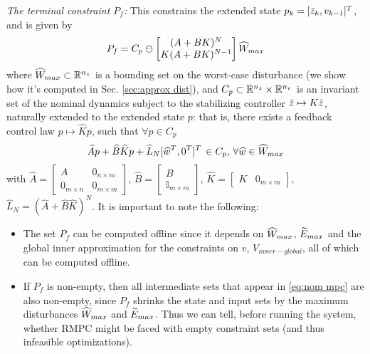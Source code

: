\textit{The terminal constraint $P_f$:}
This constrains the extended state $p_k = [\bar{z}_{k}, v_{k-1}]^T$, and is given by 
\begin{equation}
\label{eq:P_f_def}
P_f = C_p\ominus \left\lbrack \begin{matrix} (A+BK)^N \\ K(A+BK)^{N-1}\end{matrix} \right \rbrack \widehat{W}_{max}
\end{equation}
where $\widehat{W}_{max} \subset \mathbb{R}^{n_z}$ is a bounding set on the worst-case disturbance (we show how it's computed in Sec. \ref{sec:approx dist}),
and $C_p \subset \mathbb{R}^{n_z}\times \mathbb{R}^{n_v}$ is an invariant set of the nominal dynamics subject to the stabilizing controller $\bar{z} \mapsto K\bar{z}$, naturally extended to the extended state $p$:
that is, there exists a feedback control law $p \mapsto \widehat{K}p$, such that $\forall p\in C_p$
\begin{eqnarray}
\label{eq:C_def}
\widehat{A} p + \widehat{B} \widehat{K} p + \widehat{L}_N  [\widehat{w}^T, 0^T]^T \, \in C_p,\, \forall \widehat{w} \in \widehat{W}_{max} 
\end{eqnarray}
with $\widehat{A} = \begin{bmatrix} A & 0_{n \times m} \\ 0_{m \times n} & 0_{m \times m}   \end{bmatrix} $,
$\widehat{B} = \begin{bmatrix}  B \\ \mathbb{I}_{m \times m} \end{bmatrix}$, 
$\widehat{K} = \begin{bmatrix}  K & 0_{m \times m}  \end{bmatrix}$,
$\widehat{L} _N = (\widehat{A} + \widehat{B} \widehat{K})^N$.
It is important to note the following:
\begin{itemize}
	\item The set $P_f$ can be computed offline since it depends on $\widehat{W}_{max}$, $\widetilde{E}_{max}$ and the global inner approximation for the constraints on $v$, $V_{inner-global}$, all of which can be computed offline.
	\item If $P_f$ is non-empty, then all intermediate sets that appear in \eqref{eq:nom mpc} are also non-empty, since $P_f$ shrinks the state and input sets by the maximum disturbances $\widehat{W}_{max}$ and $\widetilde{E}_{max}$.	
	Thus we can tell, before running the system, whether RMPC might be faced with empty constraint sets (and thus infeasible optimizations).
\end{itemize}


